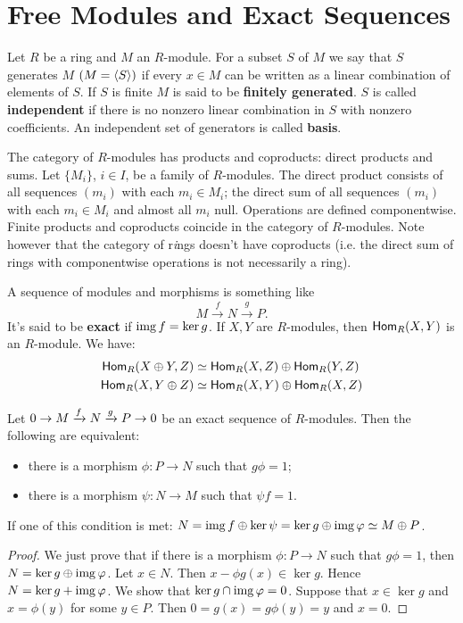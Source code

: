 \section{Free Modules and Exact Sequences}
Let $R$ be a ring and $M$ an $R$-module.
For a subset $S$ of $M$ we say that $S$ generates $M$ $(M=\langle S\rangle)$ if every $x \in M$ can be written as a linear combination of elements of $S$. 
If $S$ is finite $M$ is said to be \textbf{finitely generated}. 
$S$ is called \textbf{independent} if there is no nonzero linear combination in $S$ with nonzero coefficients. 
An independent set of generators is called \textbf{basis}. 

The category of $R$-modules has products and coproducts: direct products and sums. 
Let $\{M_i\}$, $i \in I$, be a family of $R$-modules. 
The direct product consists of all sequences $(m_i)$ with each $m_i \in M_i$; the direct sum of all sequences $(m_i)$ with each $m_i \in M_i$ and almost all $m_i$ null. 
Operations are defined componentwise. Finite products and coproducts coincide in the category of $R$-modules. 
Note however that the category of r\emph{i}ngs doesn't have coproducts (i.e. the direct sum of rings with componentwise operations is not necessarily a ring). 

A sequence of modules and morphisms is something like 
$$M \xrightarrow{f} N \xrightarrow{g} P\text{.}$$
It's said to be \textbf{exact} if $\operatorname{img} f =\ker g$. If $X,Y$ are $R$-modules, then $\operatorname{\sf{Hom}}_R(X,Y)$ is an $R$-module.
We have: 
\begin{align*} 
\operatorname{\sf{Hom}}_R(X\oplus Y, Z) & \simeq \operatorname{\sf{Hom}}_R(X,Z) \oplus \operatorname{\sf{Hom}}_R(Y,Z) \\
\operatorname{\sf{Hom}}_R(X,Y\oplus Z) & \simeq \operatorname{\sf{Hom}}_R(X,Y) \oplus \operatorname{\sf{Hom}}_R(X,Z) 
\end{align*}

\begin{thm} 
\label{split} Let $0 \rightarrow M  \xrightarrow{f} N \xrightarrow{g} P \rightarrow 0$ be an exact sequence of $R$-modules. 
Then the following are equivalent: 
\begin{itemize} 
\item there is a morphism $\phi : P \to N$ such that $g\phi=1$; 
\item there is a morphism $\psi : N \to M$ such that $\psi f=1$.
\end{itemize} 
If one of this condition is met: $N =\operatorname{img} f \oplus \ker \psi = \ker g \oplus \operatorname{img} \varphi \simeq M \oplus P$. 

\begin{proof} 
We just prove that if there is a morphism $\phi : P \to N$ such that $g\phi=1$, then $N= \ker g \oplus \operatorname{img} \varphi$. 
Let $x \in N$. Then $x - \phi g(x) \in \ker g$. 
Hence $N = \ker g + \operatorname{img} \varphi$. 
We show that $\ker g \cap \operatorname{img} \varphi=0$. 
Suppose that $x \in \ker g $ and $x =\phi(y)$ for some $ y \in P$. 
Then $0=g(x)=g\phi(y)=y$ and $x=0$.
\end{proof}
\end{thm}


